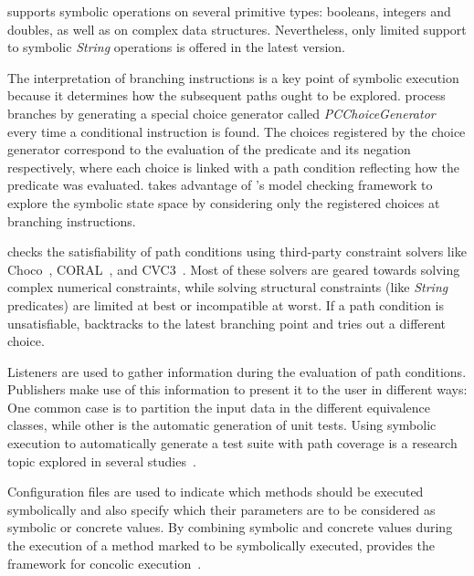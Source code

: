 \spf{} supports symbolic operations on several primitive types: booleans, integers and doubles, as well as on complex data structures. Nevertheless, only limited support to symbolic \textit{String} operations is offered in the latest \spf{} version.

The interpretation of branching instructions is a key point of symbolic execution because it determines how the subsequent paths ought to be explored. \spf{} process branches by generating a special choice generator called \textit{PCChoiceGenerator} every time a conditional instruction is found. The choices registered by the choice generator correspond to the evaluation of the predicate and its negation respectively, where each choice is linked with a path condition reflecting how the predicate was evaluated. \spf{} takes advantage of \jpf{}'s model checking framework to explore the symbolic state space by considering only the registered choices at branching instructions.

\spf{} checks the satisfiability of path conditions using third-party constraint solvers like Choco~\cite{Choco2016}, CORAL~\cite{Souza}, and CVC3~\cite{Barrett2007}. Most of these solvers are geared towards solving complex numerical constraints, while solving structural constraints (like \textit{String} predicates) are limited at best or incompatible at worst. If a path condition is unsatisfiable, \spf{} backtracks to the latest branching point and tries out a different choice.

Listeners are used to gather information during the evaluation of path conditions. Publishers make use of this information to present it to the user in different ways: One common case is to partition the input data in the different equivalence classes, while other is the automatic generation of unit tests. Using symbolic execution to automatically generate a test suite with path coverage is a research topic explored in several studies~\cite{Pasareanu2008b,Visser2004a,Godefroid2008}.

Configuration files are used to indicate which methods should be executed symbolically and also specify which their parameters are to be considered as symbolic or concrete values. By combining symbolic and concrete values during the execution of a method marked to be symbolically executed, \spf{} provides the framework for concolic execution~\cite{Godefroid2005}.








